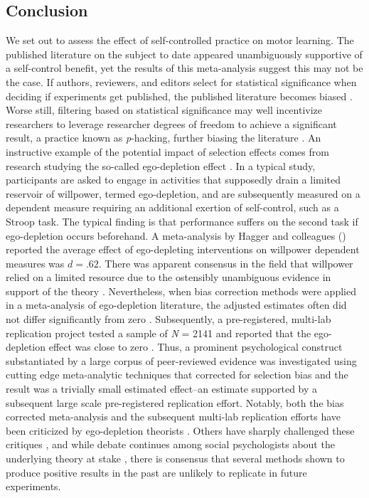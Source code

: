 \documentclass[man,floatsintext,hidelinks]{apa7}
\begin{document}
\subsection{Conclusion}
We set out to assess the effect of self-controlled practice on motor learning. The published literature on the subject to date appeared unambiguously supportive of a self-control benefit, yet the results of this meta-analysis suggest this may not be the case. If authors, reviewers, and editors select for statistical significance when deciding if experiments get published, the published literature becomes biased \parencite{Ioannidis2005-km}. Worse still, filtering based on statistical significance may well incentivize researchers to leverage researcher degrees of freedom to achieve a significant result, a practice known as \emph{p}-hacking, further biasing the literature \parencite{Wicherts2016-qz}. An instructive example of the potential impact of selection effects comes from research studying the so-called ego-depletion effect \parencite{Baumeister2007-rb,Hagger2010-cs}. In a typical study, participants are asked to engage in activities that supposedly drain a limited reservoir of willpower, termed ego-depletion, and are subsequently measured on a dependent measure requiring an additional exertion of self-control, such as a Stroop task. The typical finding is that performance suffers on the second task if ego-depletion occurs beforehand. A meta-analysis by Hagger and colleagues (\citeyear{Hagger2010-cs}) reported the average effect of ego-depleting interventions on willpower dependent measures was $d = .62$. There was apparent consensus in the field that willpower relied on a limited resource due to the ostensibly unambiguous evidence in support of the theory \parencite{Baumeister2016-df}. Nevertheless, when bias correction methods were applied in a meta-analysis of ego-depletion literature, the adjusted estimates often did not differ significantly from zero \parencite{Carter2015-zk}. Subsequently, a pre-registered, multi-lab replication project tested a sample of \emph{N} = 2141 and reported that the ego-depletion effect was close to zero \parencite{Hagger2016-ay}. Thus, a prominent psychological construct substantiated by a large corpus of peer-reviewed evidence was investigated using cutting edge meta-analytic techniques that corrected for selection bias and the result was a trivially small estimated effect--an estimate supported by a subsequent large scale pre-registered replication effort. Notably, both the bias corrected meta-analysis and the subsequent multi-lab replication efforts have been criticized by ego-depletion theorists \parencite{Cunningham2016-qy,Baumeister2016-df}. Others have sharply challenged these critiques \parencite[e.g.,][]{Schimmack2020-ea}, and while debate continues among social psychologists about the underlying theory at stake \parencite[e.g.,][]{Dang2018-xa}, there is consensus that several methods shown to produce positive results in the past are unlikely to replicate in future experiments.
\end{document}

